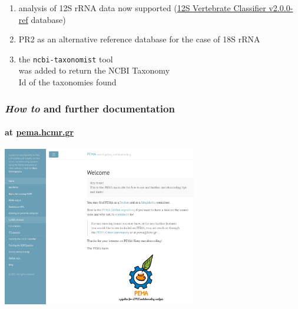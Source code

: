 \documentclass{beamer}
\begin{document}
\begin{frame}
\begin{singlespace}
\begin{textblock*}{5cm}
            \begin{enumerate}
               \item analysis of 12S rRNA data now supported
                     (\href{https://github.com/terrimporter/12SvertebrateClassifier/releases}{12S Vertebrate Classifier v2.0.0-ref} database) 
               \item PR2 as an alternative reference 
                     database for the case of 18S rRNA 
               \item the \texttt{ncbi-taxonomist} tool \\ 
                     was added to return the NCBI Taxonomy \\ 
                     Id of the taxonomies found
            \end{enumerate}
         \end{textblock*}
      \end{singlespace}


   \end{frame}

   \begin{frame}
      \frametitle{\textit{How to} and further documentation}
      \framesubtitle{at \href{http://pema.hcmr.gr}{pema.hcmr.gr}}
      \includegraphics[width=85mm]{resources/pema_site.png}
   \end{frame}
   \fi 
\end{document}
